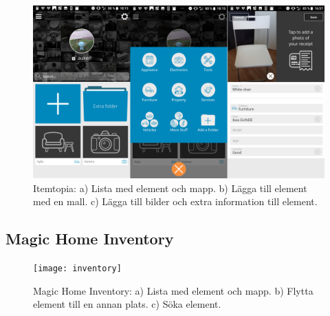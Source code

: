 \documentclass{article}
\begin{document}
\begin{figure}
\begin{center}
\includegraphics[width=1\textwidth]{itemtopia} 
\caption{Itemtopia: a) Lista med element och mapp. b) Lägga till element med en mall. c) Lägga till bilder och extra information till element.}
\end{center}
\end{figure}

\subsection{Magic Home Inventory}

\begin{figure}
\begin{center}
\texttt{[image: inventory]} 
\caption{Magic Home Inventory: a) Lista med element och mapp. b) Flytta element till en annan plats. c) Söka element.}
\end{center}
\end{figure}
\end{document}
